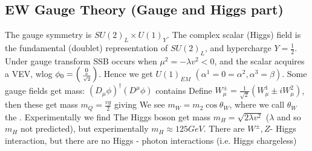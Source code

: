 \documentclass{article}
\begin{document}
\subsection{EW Gauge Theory (Gauge and Higgs part)}
The gauge symmetry is $SU(2)_L \times U(1)_Y$. The complex scalar (Higgs) field is the fundamental (doublet) representation of $SU(2)_L$, and hypercharge $Y=\frac{1}{2}$. Under gauge transform 
SSB occurs when $\mu^2 = -\lambda v^2 < 0$, and the scalar acquires a VEV, wlog $\phi_0 = \begin{psmallmatrix} 0 \\ \frac{v}{\sqrt{2}} \end{psmallmatrix}$. Hence we get $U(1)_{EM}$ $(\alpha^1 = 0 = \alpha^2, \alpha^3 = \beta)$. Some gauge fields get mass: $(D_\mu \phi)^\dagger (D^\mu \phi)$ contains 
Define $W_\mu^\pm = \frac{1}{\sqrt{2}} (W_\mu^1 \pm iW_\mu^2)$, then these get mass $m_Q = \frac{vg}{2}$ 
giving
We see $m_W = m_2 \cos\theta_W$, where we call $\theta_W$ the . Experimentally we find 
The Higgs boson get mass $m_H = \sqrt{2\lambda v^2}$ ($\lambda$ and so $m_H$ not predicted), but experimentally $m_H \approx 125 GeV$. There are $W^\pm,Z$- Higgs interaction, but there are no Higgs - photon interactions (i.e. Higgs chargeless) 
\end{document}
